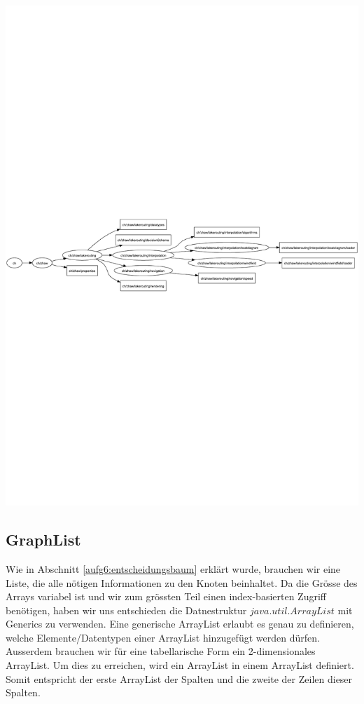 \begin{minipage}[b]{0.5\linewidth}
\centering
\includegraphics[width=\textheight, angle=90]{img/ArchitectureGraph-ch}
\end{minipage}

\subsection{GraphList}
Wie in Abschnitt \ref{aufg6:entscheidungsbaum} erklärt wurde, brauchen wir
eine Liste, die alle nötigen Informationen zu den Knoten beinhaltet. Da die
Grösse des Arrays variabel ist und wir zum grössten Teil einen index-basierten
Zugriff benötigen, haben wir uns entschieden die Datnestruktur
$java.util.ArrayList$ mit Generics zu verwenden. Eine generische ArrayList
erlaubt es genau zu definieren, welche Elemente/Datentypen einer ArrayList
hinzugefügt werden dürfen. Ausserdem brauchen wir für eine tabellarische Form
ein 2-dimensionales ArrayList. Um dies zu erreichen, wird ein ArrayList in
einem ArrayList definiert. Somit entspricht der erste ArrayList der Spalten
und die zweite der Zeilen dieser Spalten.


